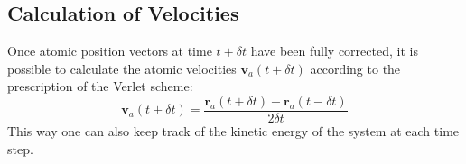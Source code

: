\subsection{Calculation of Velocities}
\label{sec:velocity-calc}
\par Once atomic position vectors at time $t + \delta t$ have been fully corrected, it is possible to calculate the atomic velocities $\mathbf{v}_a(t + \delta t)$ according to the prescription of the Verlet scheme:
\begin{equation}
\label{eq:calc-velocities}
	\mathbf{v}_a(t + \delta t) = \frac{\mathbf{r}_a(t + \delta t) - \mathbf{r}_a(t - \delta t)}{2 \delta t}
\end{equation}
This way one can also keep track of the kinetic energy of the system at each time step.